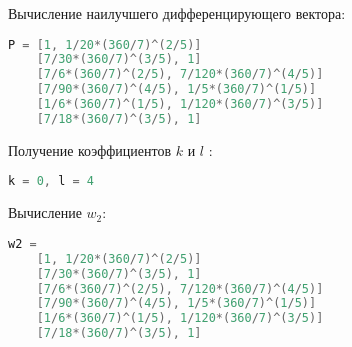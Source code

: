 \documentclass[specialist,
  substylefile = spbu.rtx,
  href,
  colorlinks=true,
  12pt]{disser}
\begin{document}
	Вычисление наилучшего дифференцирующего вектора:
	\begin{lstlisting}[language=c++,basicstyle=\footnotesize\ttfamily]
	P = [1, 1/20*(360/7)^(2/5)]
	[7/30*(360/7)^(3/5), 1]
	[7/6*(360/7)^(2/5), 7/120*(360/7)^(4/5)]
	[7/90*(360/7)^(4/5), 1/5*(360/7)^(1/5)]
	[1/6*(360/7)^(1/5), 1/120*(360/7)^(3/5)]
	[7/18*(360/7)^(3/5), 1]
\end{lstlisting}
	Получение коэффициентов $k$ и $l$
:
	\begin{lstlisting}[language=c++,basicstyle=\footnotesize\ttfamily]
	k = 0, l = 4
\end{lstlisting}
	Вычисление $w_2$:
	\begin{lstlisting}[language=c++,basicstyle=\footnotesize\ttfamily]
	w2 = 
	[1, 1/20*(360/7)^(2/5)]
	[7/30*(360/7)^(3/5), 1]
	[7/6*(360/7)^(2/5), 7/120*(360/7)^(4/5)]
	[7/90*(360/7)^(4/5), 1/5*(360/7)^(1/5)]
	[1/6*(360/7)^(1/5), 1/120*(360/7)^(3/5)]
	[7/18*(360/7)^(3/5), 1]
\end{lstlisting}
\end{document}
